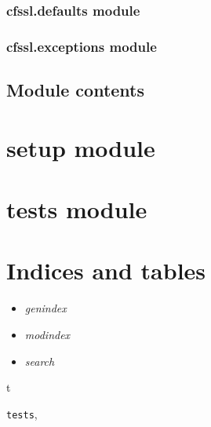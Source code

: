 \documentclass[letterpaper,10pt,english]{sphinxmanual}
\begin{document}
\subsection{cfssl.defaults module}
\label{cfssl.defaults:cfssl-defaults-module}\label{cfssl.defaults::doc}

\subsection{cfssl.exceptions module}
\label{cfssl.exceptions:cfssl-exceptions-module}\label{cfssl.exceptions::doc}

\section{Module contents}
\label{cfssl:module-contents}

\chapter{setup module}
\label{setup:setup-module}\label{setup::doc}

\chapter{tests module}
\label{tests:module-tests}\label{tests:tests-module}\label{tests::doc}

\chapter{Indices and tables}
\label{index:indices-and-tables}\begin{itemize}
\item {} 
\emph{genindex}

\item {} 
\emph{modindex}

\item {} 
\emph{search}

\end{itemize}


\renewcommand{\indexname}{Python Module Index}
\begin{theindex}
\def\bigletter#1{{\Large\sffamily#1}\nopagebreak\vspace{1mm}}
\bigletter{t}
\item {\texttt{tests}}, \pageref{tests:module-tests}
\end{theindex}

\renewcommand{\indexname}{Index}
\printindex
\end{document}
